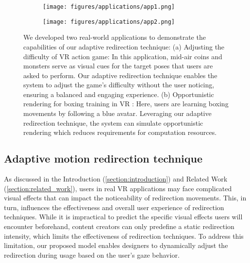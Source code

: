 \begin{figure}[t]
    \centering
    \begin{subfigure}{0.45\columnwidth}
        \texttt{[image: figures/applications/app1.png]}
        \caption{}
        \label{figure:application_adaptive}
    \end{subfigure}
    \centering
    \begin{subfigure}{0.45\columnwidth}
        \texttt{[image: figures/applications/app2.png]}
        \caption{}
        \label{figure:opportunistic}
    \end{subfigure}
    \caption{
    We developed two real-world applications to demonstrate the capabilities of our adaptive redirection technique:
    (a) Adjusting the difficulty of VR action game: 
    In this application, mid-air coins and monsters serve as visual cues for the target poses that users are asked to perform. 
    Our adaptive redirection technique enables the system to adjust the game’s difficulty without the user noticing, ensuring a balanced and engaging experience.
    (b) Opportunistic rendering for boxing training in VR : 
    Here, users are learning boxing movements by following a blue avatar. 
    Leveraging our adaptive redirection technique, the system can simulate opportunistic rendering which reduces requirements for computation resources.}
    \label{figure:application}
\end{figure}

\subsection{Adaptive motion redirection technique}
As discussed in the Introduction (\autoref{section:introduction}) and Related Work (\autoref{section:related_work}), users in real VR applications may face complicated visual effects that can impact the noticeability of redirection movements. 
This, in turn, influences the effectiveness and overall user experience of redirection techniques.
While it is impractical to predict the specific visual effects users will encounter beforehand, content creators can only predefine a static redirection intensity, which limits the effectiveness of redirection techniques. 
To address this limitation, our proposed model enables designers to dynamically adjust the redirection during usage based on the user’s gaze behavior.

